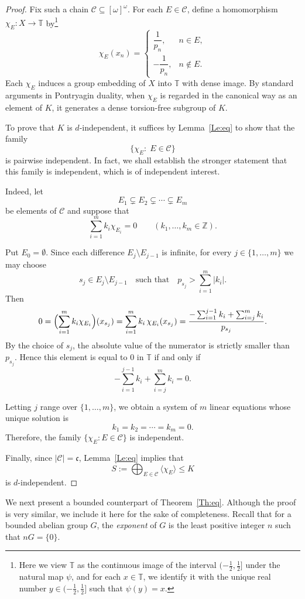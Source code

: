 \documentclass[12pt]{amsart}
\theoremstyle{definition}
\theoremstyle{remark}
\newcommand{\T}{\mathbb{T}}
\begin{document}
\begin{proof}
Fix such a chain $\mathcal{C}\subseteq[\omega]^\omega$.
For each $E\in\mathcal{C}$, define a homomorphism
$\chi_E\colon X\to\mathbb{T}$
by\footnote{Here we view $\T$ as the continuous image of the interval $(-\frac{1}{2}, \frac{1}{2}]$ under the natural map $\psi$, and for each $x \in \T$, we identify it with the unique real number $y \in (-\frac{1}{2}, \frac{1}{2}]$ such that $\psi(y) = x$.}
\[
\chi_E(x_n)=
\begin{cases}
\dfrac{1}{p_n}, & n\in E,\\[6pt]
-\dfrac{1}{p_n}, & n\notin E.
\end{cases}
\]
Each $\chi_E$ induces a group embedding of $X$ into $\mathbb{T}$ with dense
image.
By standard arguments in Pontryagin duality, when $\chi_E$ is regarded in the
canonical way as an element of $K$, it generates a dense torsion-free subgroup
of $K$.

To prove that $K$ is $d$-independent, it suffices by Lemma~\ref{Le:eq} to show that the family
\[
\{\chi_E:\; E\in\mathcal{C}\}
\]
is pairwise independent. In fact, we shall establish the stronger statement that this family is independent, which is of independent interest.

 
Indeed, let
\[
E_1\subsetneq E_2\subsetneq \cdots \subsetneq E_m
\]
be elements of $\mathcal{C}$ and suppose that
\[
\sum_{i=1}^m k_i\chi_{E_i}=0
\qquad (k_1,\dots,k_m\in\mathbb{Z}).
\]

Put $E_0=\emptyset$.
Since each difference $E_j\setminus E_{j-1}$ is infinite, for every
$j\in\{1,\dots,m\}$ we may choose
\[
s_j\in E_j\setminus E_{j-1}
\quad\text{such that}\quad
p_{s_j}>\sum_{i=1}^m |k_i|.
\]
Then
\[
0=\Bigl(\sum_{i=1}^m k_i\chi_{E_i}\Bigr)(x_{s_j})
 =\sum_{i=1}^m k_i\,\chi_{E_i}(x_{s_j})
 =\frac{-\sum_{i=1}^{j-1} k_i+\sum_{i=j}^m k_i}{p_{s_j}}.
\]
By the choice of $s_j$, the absolute value of the numerator is strictly smaller
than $p_{s_j}$.
Hence this element is equal to $0$ in $\mathbb{T}$ if and only if
\[
-\sum_{i=1}^{j-1} k_i+\sum_{i=j}^m k_i=0.
\]

Letting $j$ range over $\{1,\dots,m\}$, we obtain a system of $m$ linear
equations whose unique solution is
\[
k_1=k_2=\cdots=k_m=0.
\]
Therefore, the family $\{\chi_E:E\in\mathcal{C}\}$ is independent.


Finally, since $|\mathcal{C}|=\mathfrak{c}$, Lemma~\ref{Le:eq} implies that
\[
S:=\bigoplus_{E\in\mathcal{C}}\langle\chi_E\rangle\leq K
\]
is $d$-independent.
\end{proof}

We next present a bounded counterpart of Theorem~\ref{Th:eq}.
Although the proof is very similar, we include it here for the sake of
completeness.
Recall that for a bounded abelian group $G$, the \emph{exponent} of $G$ is the
least positive integer $n$ such that $nG=\{0\}$.
\end{document}
